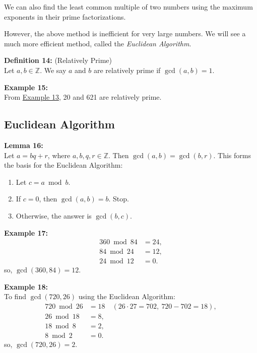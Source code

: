 \documentclass[12pt]{article}
\begin{document}
We can also find the least common multiple of two numbers using the maximum exponents in their prime factorizations.  

However, the above method is inefficient for very large numbers. We will see a much more efficient method, called the \emph{Euclidean Algorithm}.

\vspace{5mm}

\noindent\textbf{Definition 14:} (Relatively Prime)
\label{def:relprime}
\\Let $a,b \in \mathbb{Z}$. We say $a$ and $b$ are relatively prime if $\gcd(a,b) = 1$.

\vspace{5mm}

\noindent\textbf{Example 15:}
\label{ex:relprime}
\\From \hyperref[ex:primefact]{Example 13}, 20 and 621 are relatively prime.

\vspace{15mm}

\subsection{Euclidean Algorithm}

\noindent\textbf{Lemma 16:}
\label{lem:euclid}
\\Let $a=bq+r$, where $a,b,q,r \in \mathbb{Z}$. Then $\gcd(a,b) = \gcd(b,r)$.
This forms the basis for the Euclidean Algorithm:

\begin{enumerate}
    \item Let $c = a \bmod b$.
    \item If $c = 0$, then $\gcd(a,b) = b$. Stop.
    \item Otherwise, the answer is $\gcd(b,c)$.
\end{enumerate}

\noindent\textbf{Example 17:}
\label{ex:euclid360}
\begin{align*}
360 \bmod 84 &= 24, \\
84 \bmod 24 &= 12, \\
24 \bmod 12 &= 0.
\end{align*}
so, $\gcd(360,84) = 12$.

\vspace{5mm}

\noindent\textbf{Example 18:}
\label{ex:euclid720}
\\To find $\gcd(720,26)$ using the Euclidean Algorithm:
\begin{align*}
720 \bmod 26 &= 18 \quad(26\cdot 27 = 702,\ 720-702=18), \\   
26 \bmod 18 &= 8, \\
18 \bmod 8 &= 2, \\
8 \bmod 2 &= 0.
\end{align*}
so, $\gcd(720,26) = 2$.
\end{document}
